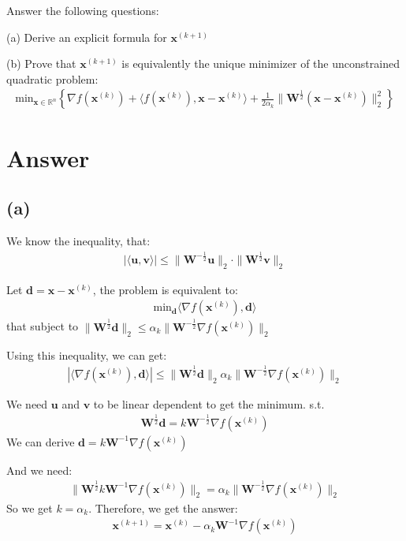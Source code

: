 \documentclass{article}
\newcommand{\R}{\mathbb{R}}
\begin{document}
Answer the following questions:

(a) Derive an explicit formula for \(\bm{x}^{(k + 1)}\)

(b) Prove that \(\bm{x}^{(k + 1)}\) is equivalently the unique minimizer of the unconstrained quadratic problem:
\begin{align*}
    \text{min}_{\bm{x} \in \R^n} \left \{ \nabla f(\bm{x}^{(k)}) + \langle f(\bm{x}^{(k)}), \bm{x} - \bm{x}^{(k)} \rangle + \frac{1}{2\alpha_k} \|\bm{W}^{\frac{1}{2}} (\bm{x} - \bm{x}^{(k)})\|_2^2 \right \}
\end{align*}

\section*{Answer}
\subsection*{(a)}
We know the inequality, that:
\begin{align*}
    |\langle \bm{u}, \bm{v} \rangle| \leq \|\bm{W}^{-\frac{1}{2}} \bm{u}\|_2 \cdot \|\bm{W}^{\frac{1}{2}} \bm{v}\|_2
\end{align*}

Let \(\bm{d} = \bm{x} - \bm{x}^{(k)}\), the problem is equivalent to:
\begin{align*}
    \text{min}_{\bm{d}} \langle \nabla f(\bm{x}^{(k)}), \bm{d} \rangle
\end{align*}
that subject to \(\|\bm{W}^{\frac{1}{2} }\bm{d}\|_2 \leq \alpha_k\|\bm{W}^{-\frac{1}{2}} \nabla f(\bm{x}^{(k)})\|_2\)

Using this inequality, we can get:
\begin{align*}
    |\langle \nabla f(\bm{x}^{(k)}), \bm{d}\rangle| \leq \|\bm{W}^{\frac{1}{2} }\bm{d}\|_2 \alpha_k\|\bm{W}^{-\frac{1}{2}} \nabla f(\bm{x}^{(k)})\|_2
\end{align*}

We need \(\bm{u}\) and \(\bm{v}\) to be linear dependent to get the minimum. s.t.
\begin{align*}
    \bm{W}^{\frac{1}{2} }\bm{d}  = k \bm{W}^{-\frac{1}{2}} \nabla f(\bm{x}^{(k)})
\end{align*}
We can derive \(\bm{d} = k \bm{W}^{-1} \nabla f(\bm{x}^{(k)})\)

And we need:
\begin{align*}
    \|\bm{W}^{\frac{1}{2}}k \bm{W}^{-1} \nabla f(\bm{x}^{(k)})\|_2 = \alpha_k\|\bm{W}^{-\frac{1}{2}} \nabla f(\bm{x}^{(k)})\|_2
\end{align*}
So we get \(k = \alpha_k\). Therefore, we get the answer:
\begin{align*}
    \bm{x}^{(k + 1)} = \bm{x}^{(k)} - \alpha_k \bm{W}^{-1} \nabla f(\bm{x}^{(k)})
\end{align*}
\end{document}
